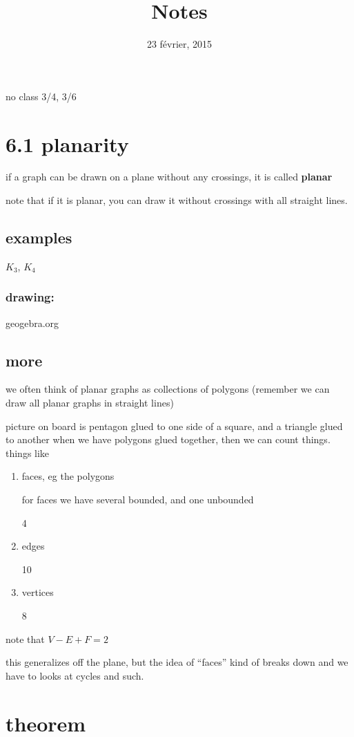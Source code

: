 \documentclass[letterpaper]{article}
\begin{document}
\title{Notes}
\date{23 février, 2015}
\maketitle
no class 3/4, 3/6
\section*{6.1 planarity}
if a graph can be drawn on a plane without any crossings, it is called {\bfseries planar}

note that if it is planar, you can draw it without crossings with all straight lines.
\subsection*{examples}
$K_3$, $K_4$

\subsubsection*{drawing:}
geogebra.org

\subsection*{more}
we often think of planar graphs as collections of polygons (remember we can draw all planar graphs in straight lines)

picture on board is pentagon glued to one side of a square, and a triangle glued to another
when we have polygons glued together, then we can count things. things like
\begin{enumerate}
\item
faces, eg the polygons

for faces we have several bounded, and one unbounded

4
\item
edges

10
\item
vertices

8
\end{enumerate}

note that $V-E+F=2$

this generalizes off the plane, but the idea of ``faces'' kind of breaks down and we have to looks at cycles and such.

\section*{theorem}
\end{document}
